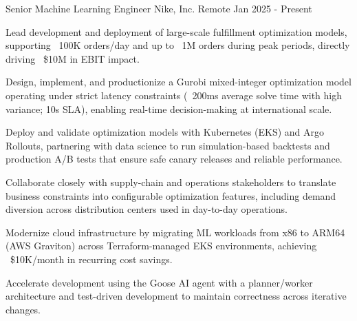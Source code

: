 


\begin{cventries}


\cventry
{Senior Machine Learning Engineer} %
{Nike, Inc.} %
{Remote} %
{Jan 2025 - Present} %
{ %
\begin{cvitems}
\item {
Lead development and deployment of large-scale fulfillment optimization models, supporting ~100K orders/day and up to ~1M orders during peak periods, directly driving ~\$10M in EBIT impact.
}
\item {
Design, implement, and productionize a Gurobi mixed-integer optimization model operating under strict latency constraints (~200ms average solve time with high variance; 10s SLA), enabling real-time decision-making at international scale.
}
\item {
Deploy and validate optimization models with Kubernetes (EKS) and Argo Rollouts, partnering with data science to run simulation-based backtests and production A/B tests that ensure safe canary releases and reliable performance.
}
\item {
Collaborate closely with supply-chain and operations stakeholders to translate business constraints into configurable optimization features, including demand diversion across distribution centers used in day-to-day operations.
}
\item {
Modernize cloud infrastructure by migrating ML workloads from x86 to ARM64 (AWS Graviton) across Terraform-managed EKS environments, achieving ~\$10K/month in recurring cost savings.
}
\item {
Accelerate development using the Goose AI agent with a planner/worker architecture and test-driven development to maintain correctness across iterative changes.
}
\end{cvitems}
}


\end{cventries}
